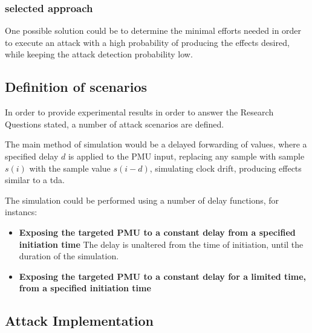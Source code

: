 \subsubsection{selected approach}
One possible solution could be to determine the minimal efforts needed in order to execute an attack with a high probability of producing the effects desired, while keeping the attack detection probability low.



\subsection{Definition of scenarios}
In order to provide experimental results in order to answer the Research Questions stated, a number of attack scenarios are defined.

The main method of simulation would be a delayed forwarding of values, where a specified delay $d$ is applied to the PMU input, replacing any sample with sample $s(i)$ with the sample value $s(i-d)$, simulating clock drift, producing effects similar to a \acrlong{tda}.

The simulation could be performed using a number of delay functions, for instancs:
\begin{itemize}
   
\item  \textbf{Exposing the targeted PMU to a constant delay from a specified initiation time} 
    The delay is unaltered from the time of initiation, until the duration of the simulation. 
\item     \textbf{Exposing the targeted PMU to a constant delay for a limited time, from a specified initiation time} 
\end{itemize}
    


\subsection{Attack Implementation}




